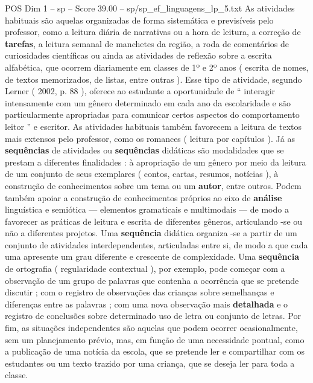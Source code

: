 \begin{textsample}{POS Dim 1 – sp – Score 39.00 – sp/sp\_ef\_linguagens\_lp\_5.txt}  \label{ex:f1_pos_117}
As atividades habituais são aquelas organizadas de forma sistemática e previsíveis pelo professor, como a leitura diária de narrativas ou a hora de leitura, a correção de \textbf{tarefas}, a leitura semanal de manchetes da região, a roda de comentários de curiosidades científicas ou ainda as atividades de reflexão sobre a escrita alfabética, que ocorrem diariamente em classes de 1º e 2º anos ( escrita de nomes, de textos memorizados, de listas, entre outras ).
Esse tipo de atividade, segundo Lerner ( 2002, p. 88 ), oferece ao estudante a oportunidade de “ interagir intensamente com um gênero determinado em cada ano da escolaridade e são particularmente apropriadas para comunicar certos aspectos do comportamento leitor ” e escritor.
As atividades habituais também favorecem a leitura de textos mais extensos pelo professor, como os romances ( leitura por capítulos ).
Já as \textbf{sequências} de atividades ou \textbf{sequências} didáticas são modalidades que se prestam a diferentes finalidades : à apropriação de um gênero por meio da leitura de um conjunto de seus exemplares ( contos, cartas, resumos, notícias ), à construção de conhecimentos sobre um tema ou um \textbf{autor}, entre outros.
Podem também apoiar a construção de conhecimentos próprios ao eixo de \textbf{análise} linguística e semiótica — elementos gramaticais e multimodais — de modo a favorecer as práticas de leitura e escrita de diferentes gêneros, articulando -se ou não a diferentes projetos.
Uma \textbf{sequência} didática organiza -se a partir de um conjunto de atividades interdependentes, articuladas entre si, de modo a que cada uma apresente um grau diferente e crescente de complexidade.
Uma \textbf{sequência} de ortografia ( regularidade contextual ), por exemplo, pode começar com a observação de um grupo de palavras que contenha a ocorrência que se pretende discutir ; com o registro de observações das crianças sobre semelhanças e diferenças entre as palavras ; com uma nova observação mais \textbf{detalhada} e o registro de conclusões sobre determinado uso de letra ou conjunto de letras.
Por fim, as situações independentes são aquelas que podem ocorrer ocasionalmente, sem um planejamento prévio, mas, em função de uma necessidade pontual, como a publicação de uma notícia da escola, que se pretende ler e compartilhar com os estudantes ou um texto trazido por uma criança, que se deseja ler para toda a classe.

\end{textsample}

